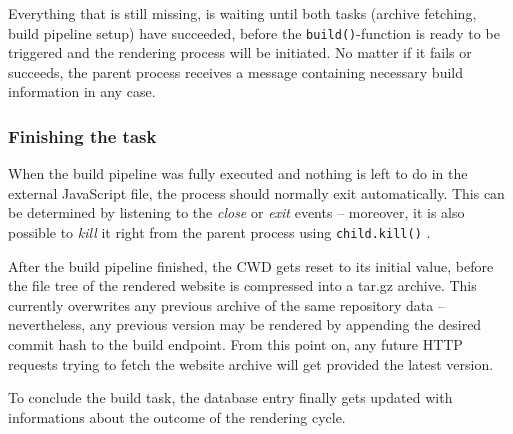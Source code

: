 Everything that is still missing, is waiting until both tasks (archive fetching, build pipeline setup) have succeeded, before the \texttt{build()}-function is ready to be triggered and the rendering process will be initiated. No matter if it fails or succeeds, the parent process receives a message containing necessary build information in any case.

\subsubsection{Finishing the task}
When the build pipeline was fully executed and nothing is left to do in the external JavaScript file, the process should normally exit automatically. This can be determined by listening to the \emph{close} or \emph{exit} events -- moreover, it is also possible to \emph{kill} it right from the parent process using \texttt{child.kill()} \cite{NodejsKillProcess}.

After the build pipeline finished, the CWD gets reset to its initial value, before the file tree of the rendered website is compressed into a tar.gz archive. This currently overwrites any previous archive of the same repository data -- nevertheless, any previous version may be rendered by appending the desired commit hash to the build endpoint. From this point on, any future HTTP requests trying to fetch the website archive will get provided the latest version.

To conclude the build task, the database entry finally gets updated with informations about the outcome of the rendering cycle.
